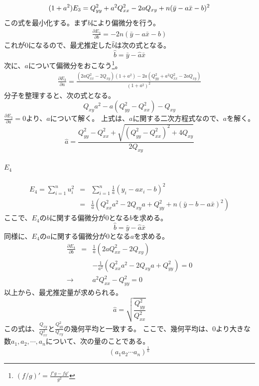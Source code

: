 \begin{equation*}
 (1+a^2)E_3 = Q^2_{yy}+a^2 Q^2_{xx}-2aQ_{xy}+n(\bar{y}-a\bar{x}-b)^2 \\
\end{equation*}
この式を最小化する。まず$b$により偏微分を行う。
\begin{eqnarray*}
 \frac{\partial E_3}{\partial b} = -2n(\bar{y}-a\bar{x}-b)
\end{eqnarray*}
これが$0$になるので、最尤推定した$\hat{b}$は次の式となる。
\begin{equation*}
 \hat{b} = \bar{y}-\hat{a}\bar{x}
\end{equation*}
次に、$a$について偏微分をおこなう\footnote{ $(f/g)'= \frac{f'g-fg'}{g^2}$ }。
\begin{eqnarray*}
\frac{\partial E_3}{\partial a} = \frac{(2aQ^2_{xx}-2Q_{xy})(1+a^2)-2a(Q^2_{yy}+a^2Q^2_{xx}-2aQ_{xy})}{(1+a^2)^2}
\end{eqnarray*}
分子を整理すると、次の式となる。
\begin{equation*}
 Q_{xy}a^2-a(Q^2_{yy}-Q^2_{xx})-Q_{xy}
\end{equation*}
$\frac{\partial E_3}{\partial a} =0$より、$a$について解く。
上式は、$a$に関する二次方程式なので、$a$を解く。
\begin{equation*}
 \hat{a} = \frac{Q^2_{yy}-Q^2_{xx}+\sqrt{(Q^2_{yy}-Q^2_{xx})^2+4Q_{xy}}}{2Q_{xy}}
\end{equation*}




\paragraph{$E_4$}
\begin{eqnarray*}
 E_4=\sum_{i=1}^n u_i^2 &=& \sum_{i=1}^n \frac{1}{a}(y_i-a x_i-b)^2 \\
 &=& \frac{1}{a}(Q^2_{xx}a^2-2Q_{xy}a+Q^2_{yy}+n(\bar{y}-b-a\bar{x})^2)
\end{eqnarray*}
ここで、$E_4$の$b$に関する偏微分が$0$となる$b$を求める。
\begin{equation*}
 \hat{b} = \bar{y}-\hat{a}\bar{x}
\end{equation*}
同様に、$E_4$の$a$に関する偏微分が$0$となる$a$を求める。
\begin{eqnarray*}
 \frac{\partial E_4}{\partial b} &=& \frac{1}{a}(2aQ^2_{xx}-2Q_{xy})\\
&& -\frac{1}{a^2}(Q^2_{xx}a^2-2Q_{xy}a+Q^2_{yy}) = 0 \\
\rightarrow && a^2 Q^2_{xx}-Q^2_{yy} = 0
\end{eqnarray*}
以上から、最尤推定量が求められる。
\begin{equation*}
 \hat{a}= \sqrt{\frac{Q^2_{yy}}{Q^2_{xx}}}
\end{equation*}
この式は、$\frac{Q_{xy}}{Q^2_{xx}}$と$\frac{Q^2_{yy}}{Q_{xy}}$の幾何平均と一致する。
ここで、幾何平均は、$0$より大きな数$a_1,a_2,\cdots,a_n$について、次の量のことである。
\begin{equation*}
 (a_1a_2\cdots a_n)^{\frac{1}{n}}
\end{equation*}

